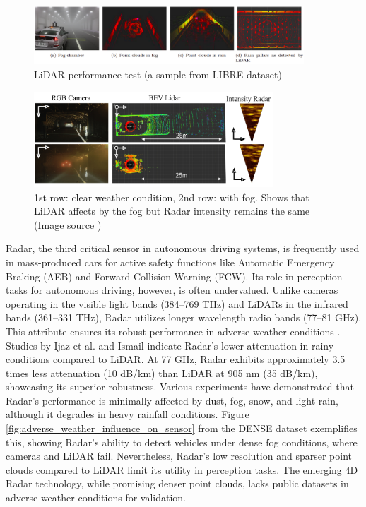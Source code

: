 \documentclass[report.tex]{subfiles}
\begin{document}
    \begin{figure}[h]
        \centering
        \includegraphics[width=0.9\textwidth]{images/LiDAR_issues.png}
        \caption{LiDAR performance test (a sample from LIBRE \cite{carballo2020libre} dataset)}
        \label{fig:LiDAR}
    \end{figure}

    \begin{figure}[h]
        \centering
        \includegraphics[width=0.8\textwidth]{images/LiDAR_in_fog.png}
        \caption{\centering 1st row: clear weather condition, 2nd row: with fog. Shows that LiDAR affects by the fog but Radar intensity remains the same  (Image source \cite{bijelic2020seeing})}
        \label{fig:LiDAR_in_fog}
    \end{figure}
    
    Radar, the third critical sensor in autonomous driving systems, is frequently used in mass-produced cars for active safety functions like Automatic Emergency Braking (AEB) and Forward Collision Warning (FCW). Its role in perception tasks for autonomous driving, however, is often undervalued. Unlike cameras operating in the visible light bands (384–769 THz) and LiDARs in the infrared bands (361–331 THz), Radar utilizes longer wavelength radio bands (77–81 GHz). This attribute ensures its robust performance in adverse weather conditions \cite{Paek2022Jun}. Studies by Ijaz et al. \cite{ijaz2012analysis} and Ismail \cite{gultepe2008measurements} indicate Radar's lower attenuation in rainy conditions compared to LiDAR. At 77 GHz, Radar exhibits approximately 3.5 times less attenuation (10 dB/km) than LiDAR at 905 nm (35 dB/km), showcasing its superior robustness. Various experiments \cite{adams2012robotic, brooker2007seeing, xu2022learned, gourova2017analysis, zang2019impact} have demonstrated that Radar's performance is minimally affected by dust, fog, snow, and light rain, although it degrades in heavy rainfall conditions. Figure \ref{fig:adverse_weather_influence_on_sensor} from the DENSE \cite{bijelic2020seeing} dataset exemplifies this, showing Radar's ability to detect vehicles under dense fog conditions, where cameras and LiDAR fail. Nevertheless, Radar's low resolution and sparser point clouds compared to LiDAR limit its utility in perception tasks. The emerging 4D Radar technology, while promising denser point clouds, lacks public datasets in adverse weather conditions for validation.
\end{document}
